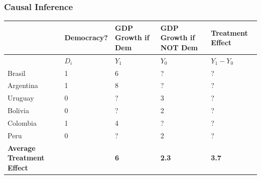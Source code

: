 \documentclass[xcolor=x11names,compress]{beamer}\usepackage[]{graphicx}\usepackage[]{xcolor}
\renewcommand{\(}{\begin{columns}}
\renewcommand{\)}{\end{columns}}
\newcommand{\<}[1]{\begin{column}{#1}}
\renewcommand{\>}{\end{column}}
\begin{document}
\begin{frame}
\frametitle{Causal Inference}
\footnotesize
\footnotesize
\begin{table}[htbp]
  \centering
    \begin{tabular}{|p{1.8cm}|p{1.8cm}|p{1.8cm}|p{1.8cm}|p{1.8cm}|}
    \hline
           & \multicolumn{1}{p{1.8cm}|}{Democracy?} & \multicolumn{1}{p{1.8cm}|}{GDP Growth if Dem} & \multicolumn{1}{p{1.8cm}|}{GDP Growth if NOT Dem} & \textbf{Treatment Effect} \bigstrut\\
    \hline
          \multicolumn{1}{|p{1.8cm}|}{} & \multicolumn{1}{p{1.8cm}|}{$D_i$} & \multicolumn{1}{p{2cm}|}{$Y_1$} & \multicolumn{1}{p{2.2cm}|}{$Y_0$} & \multicolumn{1}{p{1.8cm}|}{$Y_{1} - Y_{0}$} \bigstrut\\
    \hline
    Brasil & 1 & 6     & ?     & ? \bigstrut\\
    \hline
    Argentina & 1 & 8    & ?     & ? \bigstrut\\
    \hline
    Uruguay & 0 & ? & 3 & ?  \bigstrut\\
    \hline
    Bolivia & 0 & ?     & 2     & ? \bigstrut\\
    \hline
    Colombia & 1 & 4    & ?    & ? \bigstrut\\
    \hline
    Peru & 0 & ?     & 2     & ? \bigstrut\\
    \hline
    \textbf{Average Treatment Effect} & & \textbf{6} & \textbf{2.3} & \textbf{3.7} \bigstrut\\
    \hline
    \end{tabular}%
  \label{tab:addlabel}%
\end{table}%
\normalsize
\end{frame}
\end{document}
